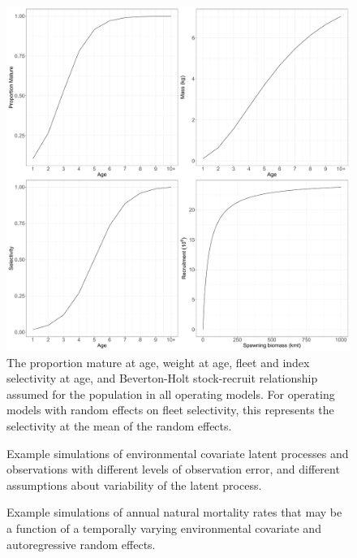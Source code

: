 \documentclass[
  12pt,
]{article}
\begin{document}
\begin{figure}
\begin{center}
\includegraphics[width = \textwidth]{om_input_plots_figure}
\end{center}
\caption{The proportion mature at age, weight at age, fleet and index selectivity at age, and Beverton-Holt stock-recruit relationship assumed for the population in all operating models. For operating models with random effects on fleet selectivity, this represents the selectivity at the mean of the random effects.}\label{om_inputs_fig}
\end{figure}

\begin{figure}
\caption{Example simulations of environmental covariate latent processes and observations with different levels of observation error, and different assumptions about variability of the latent process.}\label{om_ecov_example}
\begin{center}
\end{center}
\end{figure}

\begin{landscape}
\begin{figure}
\caption{Example simulations of annual natural mortality rates that may be a function of a temporally varying environmental covariate and autoregressive random effects.}\label{M_example}
\begin{center}
\end{center}
\end{figure}
\end{landscape}
\end{document}

